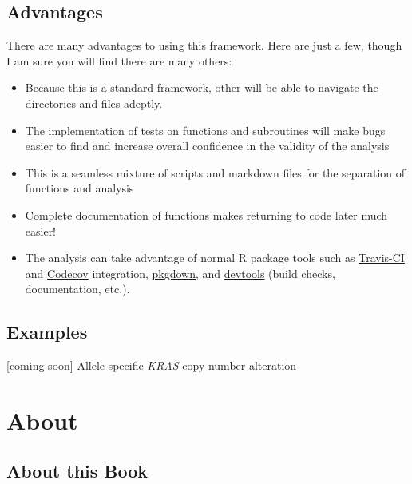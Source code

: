 \documentclass[]{book}
\providecommand{\tightlist}{%
  \setlength{\itemsep}{0pt}\setlength{\parskip}{0pt}}
\begin{document}
\hypertarget{advantages}{%
\subsection*{Advantages}\label{advantages}}

There are many advantages to using this framework. Here are just a few, though I am sure you will find there are many others:

\begin{itemize}
\tightlist
\item
  Because this is a standard framework, other will be able to navigate the directories and files adeptly.
\item
  The implementation of tests on functions and subroutines will make bugs easier to find and increase overall confidence in the validity of the analysis
\item
  This is a seamless mixture of scripts and markdown files for the separation of functions and analysis
\item
  Complete documentation of functions makes returning to code later much easier!
\item
  The analysis can take advantage of normal R package tools such as \href{https://travis-ci.org}{Travis-CI} and \href{https://codecov.io}{Codecov} integration, \href{https://pkgdown.r-lib.org}{pkgdown}, and \href{https://devtools.r-lib.org}{devtools} (build checks, documentation, etc.).
\end{itemize}

\hypertarget{examples}{%
\subsection*{Examples}\label{examples}}

{[}coming soon{]} Allele-specific \emph{KRAS} copy number alteration

\hypertarget{about}{%
\section*{About}\label{about}}

\hypertarget{about-this-book}{%
\subsection*{About this Book}\label{about-this-book}}
\end{document}
